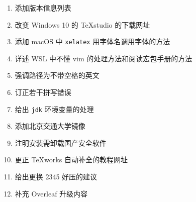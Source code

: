 \begin{enumerate}
    \item 添加版本信息列表
    \item 改变 Windows 10 的 \TeX studio 的下载网址
    \item 添加 macOS 中 \texttt{xelatex} 用字体名调用字体的方法
    \item 详述 WSL 中不懂 \textsf{vim} 的处理方法和阅读宏包手册的方法
    \item 强调路径为不带空格的英文
    \item 订正若干拼写错误
    \item 给出 \texttt{jdk} 环境变量的处理
    \item 添加北京交通大学镜像
    \item 注明安装需卸载国产安全软件
    \item 更正 \TeX works 自动补全的教程网址
    \item 给出更换 2345 好压的建议
    \item 补充 Overleaf 升级内容
\end{enumerate}